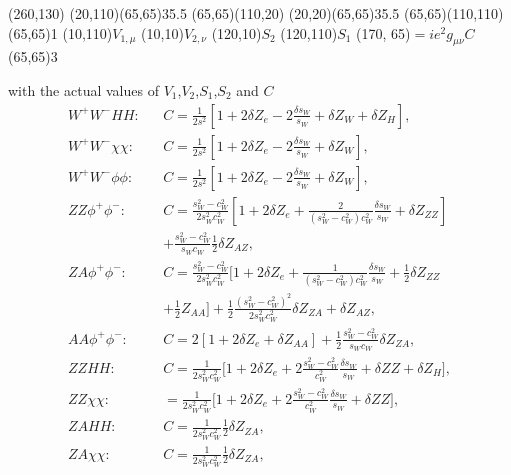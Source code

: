 \begin{axopicture}(260,130) %
	\Photon(20,110)(65,65){3}{5.5}
	\Line[dash](65,65)(110,20)
	\Photon(20,20)(65,65){3}{5.5}
	\Line[dash](65,65)(110,110)
	\Vertex(65,65){1}		
	\Text(10,110){$V_{1,\mu}$}
	\Text(10,10){$V_{2,\nu}$}
	\Text(120,10){$S_2$}
	\Text(120,110){$S_1$}
	\Text(170, 65){$=ie^2g_{\mu\nu}C$}
	\Vertex(65,65){3}
\end{axopicture}
\newline with the actual values of $V_1$,$V_2$,$S_1$,$S_2$ and $C$
\begin{eqnarray*}
	W^+W^-HH:&&C=\frac{1}{2s^2}\left[ 1+2\delta Z_e-2\frac{\delta s_W}{s_W}+\delta Z_W+\delta Z_H \right],\nonumber\\
	W^+W^-\chi\chi:&&C=\frac{1}{2s^2}\left[ 1+2\delta Z_e-2\frac{\delta s_W}{s_W}+\delta Z_W \right],\nonumber\\
	W^+W^-\phi\phi:&&C=\frac{1}{2s^2}\left[ 1+2\delta Z_e-2\frac{\delta s_W}{s_W}+\delta Z_W \right],\nonumber\\
	ZZ\phi^+\phi^-:&&C=\frac{s^2_W-c^2_W}{2s_W^2c_W^2}\left[ 1+2\delta Z_e+\frac{2}{(s_W^2-c_W^2)c^2_W}\frac{\delta s_W}{s_W}+\delta Z_{ZZ} \right]\nonumber\\
	&&+\frac{s^2_W-c^2_W}{s_Wc_W}\frac{1}{2}\delta Z_{AZ},\nonumber\\
	ZA\phi^+\phi^-:&&C=\frac{s^2_W-c^2_W}{2s_W^2c_W^2}\biggl[ 1+2\delta Z_e+\frac{1}{(s_W^2-c_W^2)c^2_W}\frac{\delta s_W}{s_W}+\frac{1}{2}\delta Z_{ZZ} \nonumber\\
	&&+\frac{1}{2}Z_{AA}\biggr]+\frac{1}{2}\frac{(s_W^2-c_W^2)^2}{2s^2_Wc^2_W}\delta Z_{ZA}+\delta Z_{AZ},\nonumber\\
	AA\phi^+\phi^-:&& C=2[1+2\delta Z_e+\delta Z_{AA}]+\frac{1}{2}\frac{s^2_W-c^2_W}{s_Wc_W}\delta Z_{ZA},\nonumber\\
	ZZHH:&&C=\frac{1}{2s^2_Wc^2_W}\biggl[ 1+2\delta Z_e+2\frac{s^2_W-c^2_W}{c^2_W}\frac{\delta s_W}{s_W}+\delta ZZ+\delta Z_H \biggr],\nonumber\\
	ZZ\chi\chi:&&=\frac{1}{2s^2_Wc^2_W}\biggl[ 1+2\delta Z_e+2\frac{s^2_W-c^2_W}{c^2_W}\frac{\delta s_W}{s_W}+\delta ZZ \biggr],\nonumber\\
	ZAHH:&& C=\frac{1}{2s^2_Wc^2_W}\frac{1}{2}\delta Z_{ZA},\nonumber\\
	ZA\chi\chi:&& C=\frac{1}{2s^2_Wc^2_W}\frac{1}{2}\delta Z_{ZA},\nonumber\\
\end{eqnarray*}
